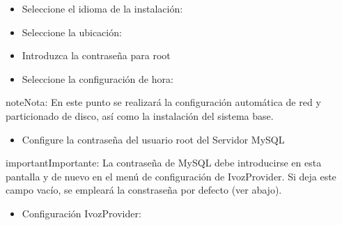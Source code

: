\documentclass[letterpaper,10pt,spanish]{sphinxmanual}
\begin{document}
\noindent{}
\begin{itemize}
\item {} 
Seleccione el idioma de la instalación:

\end{itemize}

\noindent{}
\begin{itemize}
\item {} 
Seleccione la ubicación:

\end{itemize}

\noindent{}
\begin{itemize}
\item {} 
Introduzca la contraseña para root

\end{itemize}

\noindent{}
\begin{itemize}
\item {} 
Seleccione la configuración de hora:

\end{itemize}

\noindent{}

\begin{notice}{note}{Nota:}
En este punto se realizará la configuración automática de red y particionado de disco, así como la instalación del sistema base.
\end{notice}
\begin{itemize}
\item {} 
Configure la contraseña del usuario root del Servidor MySQL

\end{itemize}

\noindent{}

\begin{notice}{important}{Importante:}
La contraseña de MySQL debe introducirse en esta pantalla y de nuevo en el menú de configuración de IvozProvider. Si deja este campo vacío, se empleará la constraseña por defecto (ver abajo).
\end{notice}
\begin{itemize}
\item {} 
Configuración IvozProvider:

\end{itemize}
\end{document}
